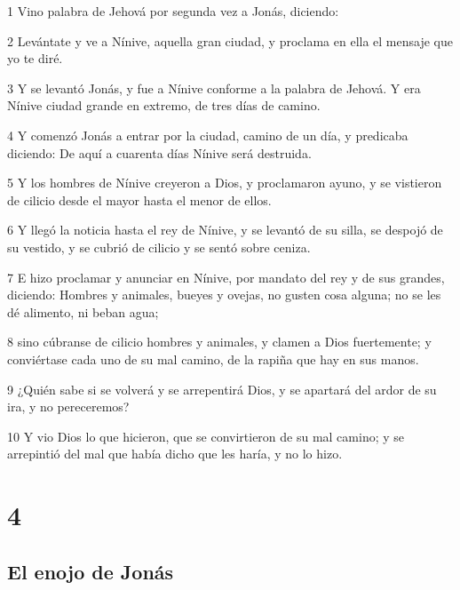 \par 1 Vino palabra de Jehová por segunda vez a Jonás, diciendo:
\par 2 Levántate y ve a Nínive, aquella gran ciudad, y proclama en ella el mensaje que yo te diré.
\par 3 Y se levantó Jonás, y fue a Nínive conforme a la palabra de Jehová. Y era Nínive ciudad grande en extremo, de tres días de camino.
\par 4 Y comenzó Jonás a entrar por la ciudad, camino de un día, y predicaba diciendo: De aquí a cuarenta días Nínive será destruida.
\par 5 Y los hombres de Nínive creyeron a Dios, y proclamaron ayuno, y se vistieron de cilicio desde el mayor hasta el menor de ellos. 
\par 6 Y llegó la noticia hasta el rey de Nínive, y se levantó de su silla, se despojó de su vestido, y se cubrió de cilicio y se sentó sobre ceniza.
\par 7 E hizo proclamar y anunciar en Nínive, por mandato del rey y de sus grandes, diciendo: Hombres y animales, bueyes y ovejas, no gusten cosa alguna; no se les dé alimento, ni beban agua;
\par 8 sino cúbranse de cilicio hombres y animales, y clamen a Dios fuertemente; y conviértase cada uno de su mal camino, de la rapiña que hay en sus manos.
\par 9 ¿Quién sabe si se volverá y se arrepentirá Dios, y se apartará del ardor de su ira, y no pereceremos?
\par 10 Y vio Dios lo que hicieron, que se convirtieron de su mal camino; y se arrepintió del mal que había dicho que les haría, y no lo hizo.

\chapter{4}

\section*{El enojo de Jonás}

